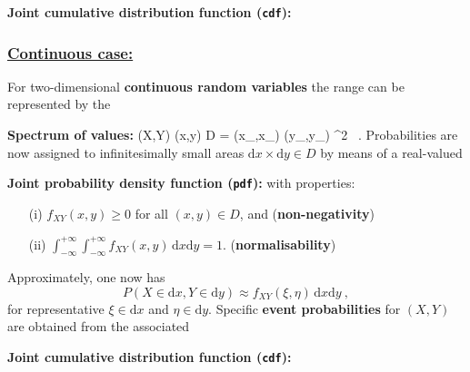 \medskip
\noindent
\textbf{Joint cumulative distribution function (\texttt{cdf}):}
%
\be
{}
\ee
%

\subsubsection[Continous case]{\underline{Continuous case:}}
For two-dimensional \textbf{continuous random variables} the range 
can be represented by the

\medskip
\noindent
\textbf{Spectrum of values:}
%
\be
(X,Y) \mapsto (x,y) \in D = (x_,x_) \times 
(y_,y_) \subseteq {}^{2} \ .
\ee
%
Probabilities are now assigned to infinitesimally small areas
$\mathrm{d}x \times \mathrm{d}y \in D$ by means of a real-valued

\medskip
\noindent
\textbf{Joint probability density function (\texttt{pdf}):}
%
\be
{}
\ee
%
with properties:\\[-5mm]
%
\begin{center}
\begin{itemize}
\item[(i)] $f_{XY}(x,y) \geq 0$ for all $(x,y) \in D$, and
\hfill (\textbf{non-negativity})\\[-5mm]

\item[(ii)] ${\displaystyle\int_{-\infty}^{+\infty}
\int_{-\infty}^{+\infty}
f_{XY}(x,y)\,\mathrm{d}x\mathrm{d}y=1}$.
\hfill (\textbf{normalisability})\\[-5mm]

\end{itemize}
\end{center}
%
Approximately, one now has
%
\[
P(X \in \mathrm{d}x, Y \in \mathrm{d}y) \approx f_{XY}(\xi, \eta)\,
\mathrm{d}x\mathrm{d}y \ ,
\]
%
for representative $\xi \in \mathrm{d}x$ and $\eta \in
\mathrm{d}y$. Specific \textbf{event probabilities} for $(X,Y)$ are
obtained from the associated

\medskip
\noindent
\textbf{Joint cumulative distribution function (\texttt{cdf}):}
%
\be
{}
\ee
%

